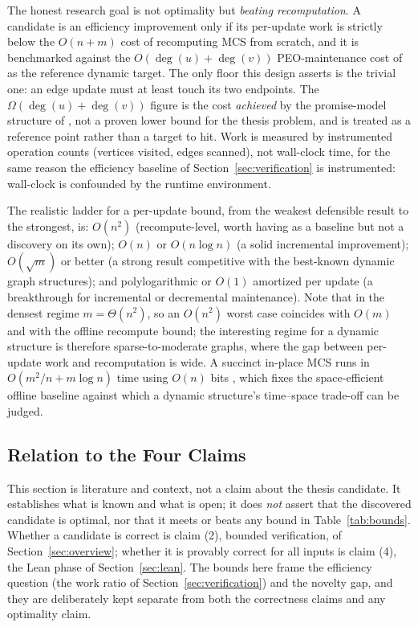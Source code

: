 \documentclass[12pt,a4paper]{article}
\begin{document}
The honest research goal is not optimality but \emph{beating recomputation}. A candidate is an efficiency improvement only if its per-update work is strictly below the $O(n+m)$ cost of recomputing MCS from scratch, and it is benchmarked against the $O(\deg(u)+\deg(v))$ PEO-maintenance cost of \cite{banerjee2018maintaining} as the reference dynamic target. The only floor this design asserts is the trivial one: an edge update must at least touch its two endpoints. The $\Omega(\deg(u)+\deg(v))$ figure is the cost \emph{achieved} by the promise-model structure of \cite{banerjee2018maintaining}, not a proven lower bound for the thesis problem, and is treated as a reference point rather than a target to hit. Work is measured by instrumented operation counts (vertices visited, edges scanned), not wall-clock time, for the same reason the efficiency baseline of Section~\ref{sec:verification} is instrumented: wall-clock is confounded by the runtime environment.

The realistic ladder for a per-update bound, from the weakest defensible result to the strongest, is: $O(n^2)$ (recompute-level, worth having as a baseline but not a discovery on its own); $O(n)$ or $O(n \log n)$ (a solid incremental improvement); $O(\sqrt{m})$ or better (a strong result competitive with the best-known dynamic graph structures); and polylogarithmic or $O(1)$ amortized per update (a breakthrough for incremental or decremental maintenance). Note that in the densest regime $m = \Theta(n^2)$, so an $O(n^2)$ worst case coincides with $O(m)$ and with the offline recompute bound; the interesting regime for a dynamic structure is therefore sparse-to-moderate graphs, where the gap between per-update work and recomputation is wide. A succinct in-place MCS runs in $O(m^2/n + m \log n)$ time using $O(n)$ bits \cite{chakraborty2019space}, which fixes the space-efficient offline baseline against which a dynamic structure's time--space trade-off can be judged.

\subsection{Relation to the Four Claims}

This section is literature and context, not a claim about the thesis candidate. It establishes what is known and what is open; it does \emph{not} assert that the discovered candidate is optimal, nor that it meets or beats any bound in Table~\ref{tab:bounds}. Whether a candidate is correct is claim (2), bounded verification, of Section~\ref{sec:overview}; whether it is provably correct for all inputs is claim (4), the Lean phase of Section~\ref{sec:lean}. The bounds here frame the efficiency question (the work ratio of Section~\ref{sec:verification}) and the novelty gap, and they are deliberately kept separate from both the correctness claims and any optimality claim.
\end{document}
